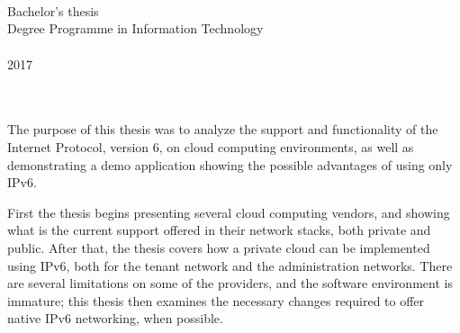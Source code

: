 %


%
%
%


\chapter*{}
\begingroup
\noindent
{}
\\
Bachelor's thesis
\\[0.5em]
Degree Programme in Information Technology
\\[0.5em]
\StudyGroup
\\[0.5em]
2017
\\[1em]
\AuthorName
\\[0.35cm]
\sffamily\fontsize{14}{12}\selectfont
\MakeUppercase{\DocumentTitle}
\\[0.2em]
\endgroup

The purpose of this thesis was to analyze the support and functionality of the Internet Protocol, version 6, on cloud computing environments, as well as demonstrating a demo application showing the possible advantages of using only IPv6.

First the thesis begins presenting several cloud computing vendors, and showing what is the current support offered in their network stacks, both private and public. After that, the thesis covers how a private cloud can be implemented using IPv6, both for the tenant network and the administration networks. 
There are several limitations on some of the providers, and the software environment is immature; this thesis then examines the necessary changes required to offer native IPv6 networking, when possible.

